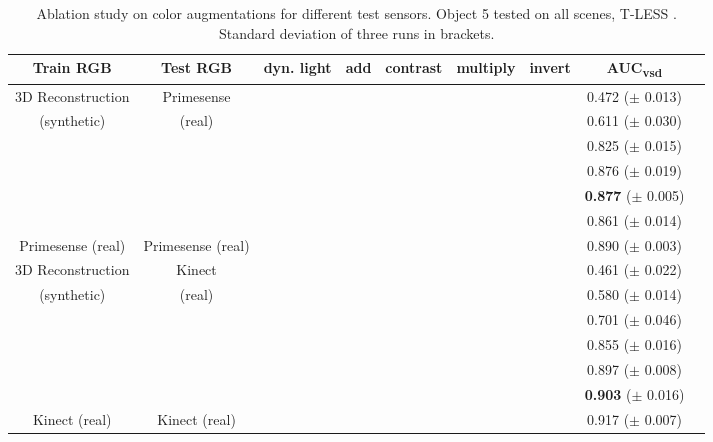 \begin{table}[t]
	\centering
	\scriptsize
	\captionsetup{justification=centering,width=.8\textwidth}
	\caption{Ablation study on color augmentations for different test sensors. Object 5 tested on all scenes, T-LESS \cite{hodan2017tless}. Standard deviation of three runs in brackets.}
	\begin{adjustbox}{max width=.8\textwidth}
		\begin{tabular}{ccccccccc}
			\toprule
			\textbf{Train RGB} & \textbf{Test RGB}
			& dyn. light & add & contrast & multiply & invert & \textbf{AUC\textsubscript{vsd}}\\
			\midrule
			3D Reconstruction & Primesense &  \OK  &  &  &  &  & 0.472 ($\pm$ 0.013)\\
			(synthetic)& (real) & \OK  & \OK &  &  &   & 0.611 ($\pm$ 0.030)\\
			&& \OK  & \OK & \OK &  &  & 0.825 ($\pm$ 0.015)\\
			&& \OK  & \OK & \OK &  \OK&   & 0.876 ($\pm$ 0.019)\\
			&& \OK  & \OK & \OK &  \OK&  \OK & \textbf{0.877} ($\pm$ 0.005)\\
			&&    & \OK & \OK &  \OK&  & 0.861 ($\pm$ 0.014)\\   
			\midrule
			Primesense (real) & Primesense (real) & & \OK & \OK &  \OK& & 0.890 ($\pm$ 0.003)\\
			\midrule
			3D Reconstruction&Kinect &  \OK  &  &  &  &  & 0.461 ($\pm$ 0.022)\\
			(synthetic)&(real) &  \OK  & \OK &  &  &   & 0.580 ($\pm$ 0.014)\\
			&&  \OK  & \OK & \OK &  &  & 0.701 ($\pm$ 0.046)\\
			&&  \OK  & \OK & \OK &  \OK&   & 0.855 ($\pm$ 0.016)\\
			&&  \OK  & \OK & \OK &  \OK&  \OK & 0.897 ($\pm$ 0.008)\\
			&&    & \OK & \OK &  \OK&   & \textbf{0.903} ($\pm$ 0.016)\\
			\midrule
			Kinect (real)& Kinect (real) & & \OK & \OK &  \OK& & 0.917 ($\pm$ 0.007)\\
		\end{tabular}
	\end{adjustbox}
	\label{tab:auc_aug}
\end{table}
